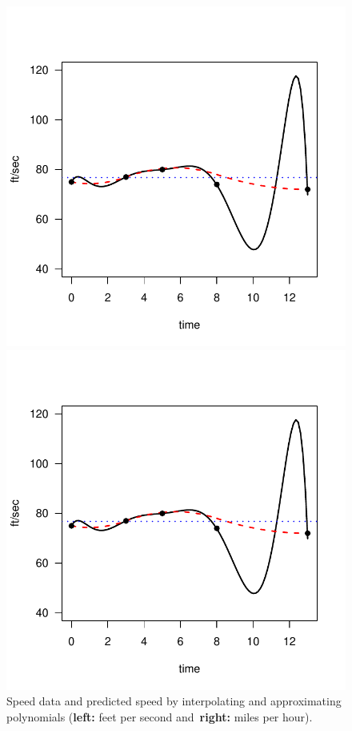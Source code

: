 \documentclass[11pt]{article}
\begin{document}
\begin{figure}[ht!]\centering
\begin{minipage}{0.48\textwidth}
\includegraphics[width=\textwidth]{3_approximation/speed2.pdf}

\end{minipage}
\begin{minipage}{0.48\textwidth}

\includegraphics[width=\textwidth]{3_approximation/speed2.pdf}
\end{minipage}

\caption{Speed data and predicted speed by interpolating and approximating polynomials (\textbf{left:} feet per second and~\textbf{right:} miles per hour).}\label{fig::speed_plots2}
\end{figure}
\end{document}

